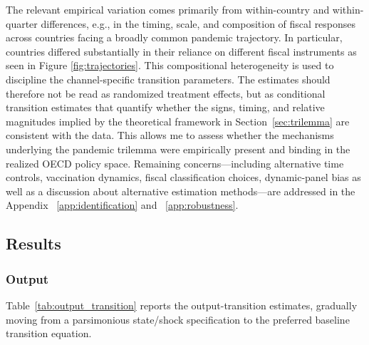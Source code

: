 \documentclass[12pt, a4paper]{article}
\begin{document}
The relevant empirical variation comes primarily from within-country and within-quarter differences, e.g., in the timing, scale, and composition of fiscal responses across countries facing a broadly common pandemic trajectory. In particular, countries differed substantially in their reliance on different fiscal instruments as seen in Figure \ref{fig:trajectories}. This compositional heterogeneity is used to discipline the channel-specific transition parameters. The estimates should therefore not be read as randomized treatment effects, but as conditional transition estimates that quantify whether the signs, timing, and relative magnitudes implied by the theoretical framework in Section~\ref{sec:trilemma} are consistent with the data. This allows me to assess whether the mechanisms underlying the pandemic trilemma were empirically present and binding in the realized OECD policy space. Remaining concerns---including alternative time controls, vaccination dynamics, fiscal classification choices, dynamic-panel bias as well as a discussion about alternative estimation methods---are addressed in the Appendix ~\ref{app:identification} and ~\ref{app:robustness}.

\subsection{Results}
\label{sec:results_empirical}
\subsubsection{Output}
\label{subsub:results_output}

Table~\ref{tab:output_transition} reports the output-transition estimates, gradually moving from a parsimonious state/shock specification to the preferred baseline transition equation.
\end{document}
